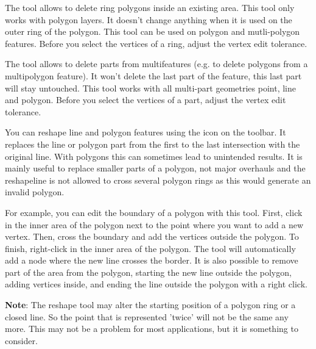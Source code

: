 
The  tool allows to delete ring
polygons inside an existing area. This tool only works with polygon layers.
It doesn't change anything when it is used on the outer ring of the polygon.
This tool can be used on polygon and mutli-polygon features. Before
you select the vertices of a ring, adjust the vertex edit tolerance.


The  tool allows to delete parts
from multifeatures (e.g. to delete polygons from a multipolygon feature). It
won't delete the last part of the feature, this last part will stay untouched.
This tool works with all multi-part geometries point, line and polygon. Before
you select the vertices of a part, adjust the vertex edit tolerance.


You can reshape line and polygon features using the
 icon on the toolbar. It
replaces the line or polygon part from the first to the last intersection
with the original line. With polygons this can sometimes lead to unintended
results. It is mainly useful to replace smaller parts of a polygon, not major
overhauls and the reshapeline is not allowed to cross several polygon rings
as this would generate an invalid polygon.

For example, you can edit the boundary of a polygon with this tool. First,
click in the inner area of the polygon next to the point where you want to 
add a new vertex. Then, cross the boundary and add the vertices outside the
polygon. To finish, right-click in the inner area of the polygon. The tool
will automatically add a node where the new line crosses the border. It is 
also possible to remove part of the area from the polygon, starting the new
line outside the polygon, adding vertices inside, and ending the line outside
the polygon with a right click.

\textbf{Note}: The reshape tool may alter the starting position of a polygon
ring or a closed line. So the point that is represented 'twice' will not be
the same any more. This may not be a problem for most applications, but it is
something to consider.


